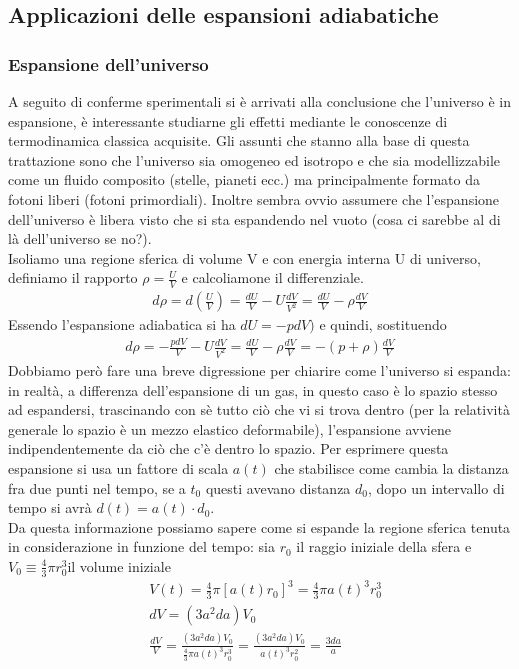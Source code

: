 \documentclass[10pt,a4paper]{article}
\begin{document}
\subsection{Applicazioni delle espansioni adiabatiche}
\subsubsection{Espansione dell'universo}
A seguito di conferme sperimentali si è arrivati alla conclusione che l'universo è in espansione, è interessante studiarne gli effetti mediante le conoscenze di termodinamica classica acquisite. Gli assunti che stanno alla base di questa trattazione sono che l'universo sia omogeneo ed isotropo e che sia modellizzabile come un fluido composito (stelle, pianeti ecc.) ma principalmente formato da fotoni liberi (fotoni primordiali). Inoltre sembra ovvio assumere che l'espansione dell'universo è libera visto che si sta espandendo nel vuoto (cosa ci sarebbe al di là dell'universo se no?).\\
Isoliamo una regione sferica di volume V e con energia interna U di universo, definiamo il rapporto \(\rho = \frac{U}{V}\) e calcoliamone il differenziale. 
\begin{align*}
	d\rho = d\left(\frac{U}{V}\right) = \frac{d U}{V}- U \frac{dV}{V^2} = \frac{dU}{V}-\rho\frac{dV}{V}
\end{align*}
Essendo l'espansione adiabatica si ha \(dU = -pdV)\) e quindi, sostituendo
\begin{align*}
	d\rho = -\frac{pdV}{V}- U \frac{dV}{V^2} = \frac{dU}{V}-\rho\frac{dV}{V} = -(p + \rho)\frac{dV}{V}
\end{align*}
Dobbiamo però fare una breve digressione per chiarire come l'universo si espanda: in realtà, a differenza dell'espansione di un gas, in questo caso è lo spazio stesso ad espandersi, trascinando con sè tutto ciò che vi si trova dentro (per la relatività generale lo spazio è un mezzo elastico deformabile), l'espansione avviene indipendentemente da ciò che c'è dentro lo spazio. Per esprimere questa espansione si usa un fattore di scala $a(t)$ che stabilisce come cambia la distanza fra due punti nel tempo, se a $t_0$ questi avevano distanza $d_0$, dopo un intervallo di tempo si avrà \(d(t) = a(t)\cdot d_0\).\\
Da questa informazione possiamo sapere come si espande la regione sferica tenuta in considerazione in funzione del tempo: sia $r_0$ il raggio iniziale della sfera e $V_0 \equiv \frac{4}{3}\pi r_0^3$il volume iniziale
\begin{align*}
	&V(t) = \frac{4}{3}\pi[a(t) r_0]^3 = \frac{4}{3}\pi a(t)^3 r_0^3\\
	&dV = (3 a^2 da) V_0\\
	&\frac{dV}{V} = \frac{(3 a^2 da) V_0}{\frac{4}{3}\pi a(t)^3 r_0^3} = \frac{(3 a^2 da) V_0}{ a(t)^3 r_0^2} =\frac{3 da}{a}
\end{align*}
\end{document}
